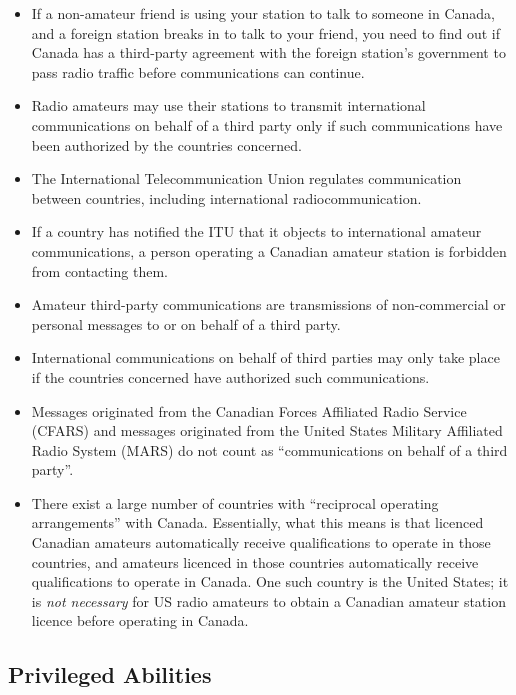 \documentclass[letterpaper,12pt]{scrartcl}
\begin{document}
\begin{itemize}
\item If a non-amateur friend is using your station to talk to someone in Canada, and a foreign station breaks in to talk to your friend,
you need to find out if Canada has a third-party agreement with the foreign station's government to pass radio traffic
before communications can continue.
\item Radio amateurs may use their stations to transmit international communications on behalf of a third party only if
such communications have been authorized by the countries concerned.
\item The International Telecommunication Union regulates communication between countries, including international radiocommunication.
\item If a country has notified the ITU that it objects to international amateur communications, a person operating a Canadian amateur station is forbidden from contacting them.
\item Amateur third-party communications are transmissions of non-commercial or personal messages to or on behalf of a third party.
\item International communications on behalf of third parties may only take place if the countries concerned have authorized such communications.
\item Messages originated from the Canadian Forces Affiliated Radio Service (CFARS) and messages originated from the United States Military Affiliated Radio System (MARS)
do not count as ``communications on behalf of a third party''.
\item There exist a large number of countries with ``reciprocal operating arrangements'' with Canada. Essentially, what this means
is that licenced Canadian amateurs automatically receive qualifications to operate in those countries, and amateurs licenced in those countries
automatically receive qualifications to operate in Canada. One such country is the United States; it is \textit{not necessary} for US radio amateurs to obtain a Canadian amateur station licence
before operating in Canada.
\end{itemize}

\subsection{Privileged Abilities}
\end{document}
